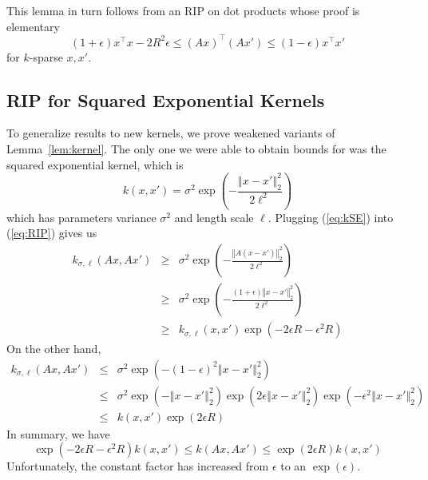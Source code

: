 \documentclass[english]{article}
\theoremstyle{plain}
\begin{document}
This lemma in turn follows from an RIP on dot products whose proof is elementary
\[
(1 + \epsilon)x^\top x - 2R^2\epsilon \leq (Ax)^\top (Ax') \leq (1 - \epsilon) x^\top x'
\label{eq:dot-rip}
\]
for $k$-sparse $x,x'$.

\subsection{RIP for Squared Exponential Kernels}
To generalize results to new kernels, we prove weakened variants of Lemma~\ref{lem:kernel}. The only one we were able to obtain bounds for was the squared exponential kernel, which is
\begin{equation}
k(x,x')=\sigma^{2}\exp\left(-\frac{\left\Vert x-x'\right\Vert _{2}^{2}}{2\ell^{2}}\right) \label{eq:kSE}
\end{equation}
which has parameters variance $\sigma^{2}$ and length scale $\ell$.
Plugging (\ref{eq:kSE}) into (\ref{eq:RIP}) gives us
\begin{eqnarray*}
k_{\sigma,\ell}(Ax,Ax') & \geq & \sigma^{2}\exp\left(-\frac{\left\Vert A(x-x')\right\Vert _{2}^{2}}{2\ell^{2}}\right)\\
 & \geq & \sigma^{2}\exp\left(-\frac{(1+\epsilon)\left\Vert x-x'\right\Vert _{2}^{2}}{2\ell^{2}}\right)\\
 & \geq & k_{\sigma,\ell}(x,x')\exp\left(-2\epsilon R-\epsilon^{2}R\right)
\end{eqnarray*}
On the other hand,
\begin{eqnarray*}
k_{\sigma,\ell}(Ax,Ax') & \leq & \sigma^{2}\exp\left(-(1-\epsilon)^{2}\left\Vert x-x'\right\Vert _{2}^{2}\right)\\
 & \leq & \sigma^{2}\exp\left(-\left\Vert x-x'\right\Vert _{2}^{2}\right)\exp\left(2\epsilon\left\Vert x-x'\right\Vert _{2}^{2}\right)\exp\left(-\epsilon^{2}\left\Vert x-x'\right\Vert _{2}^{2}\right)\\
 & \leq & k(x,x')\exp(2\epsilon R)
\end{eqnarray*}
In summary, we have
\begin{equation}
\exp(-2\epsilon R-\epsilon^{2}R)k(x,x')\leq k(Ax,Ax')\leq\exp(2\epsilon R)k(x,x')\label{eq:exp-bound}
\end{equation}
Unfortunately, the constant factor has increased from $\epsilon$
to an $\exp(\epsilon)$.
\end{document}
